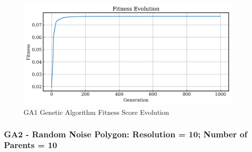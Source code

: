 \documentclass{article}
\begin{document}
\begin{figure}[H]
    \centering
    \includegraphics[width=0.75\linewidth]{figures/GAResults/GA1/1000gens_4pars_100initpop_5pcent_mut.png}
    \caption{GA1 Genetic Algorithm Fitness Score Evolution}
    \label{fig:GA1_fitness_curve}
\end{figure}

\subsubsection{GA2 - Random Noise Polygon: Resolution = 10; Number of Parents = 10}
\end{document}
